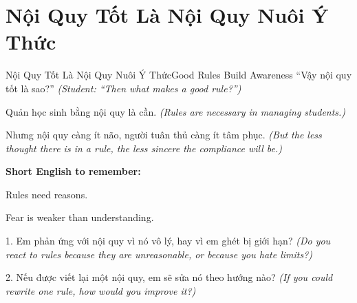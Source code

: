 \section{Nội Quy Tốt Là Nội Quy Nuôi Ý Thức}
\begin{truyen}{Nội Quy Tốt Là Nội Quy Nuôi Ý Thức}{Good Rules Build Awareness}
 ``Vậy nội quy tốt là sao?''
\textit{(Student: ``Then what makes a good rule?'')}

\end{truyen}

\begin{baihoc}
Quản học sinh bằng nội quy là cần.
\textit{(Rules are necessary in managing students.)}

Nhưng nội quy càng ít não, người tuân thủ càng ít tâm phục.
\textit{(But the less thought there is in a rule, the less sincere the compliance will be.)}
\end{baihoc}

\begin{ghinhoanh}
\textbf{Short English to remember:}

Rules need reasons.

Fear is weaker than understanding.
\end{ghinhoanh}

\begin{tuhocnhanh}
1. Em phản ứng với nội quy vì nó vô lý, hay vì em ghét bị giới hạn? \textit{(Do you react to rules because they are unreasonable, or because you hate limits?)}

2. Nếu được viết lại một nội quy, em sẽ sửa nó theo hướng nào? \textit{(If you could rewrite one rule, how would you improve it?)}
\end{tuhocnhanh}

\ngancach
